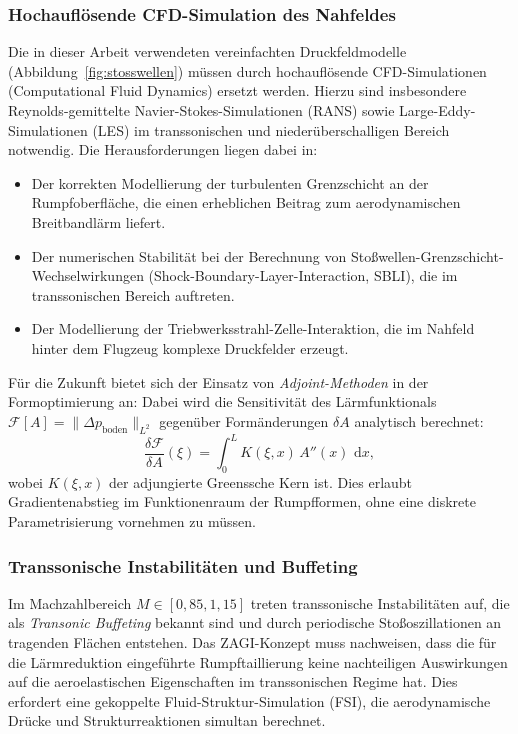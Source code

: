 ﻿\documentclass[12pt,a4paper]{article}
\theoremstyle{definition}
\theoremstyle{remark}
\newcommand{\dd}{\,\mathrm{d}}
\begin{document}
\subsubsection{Hochauflösende CFD-Simulation des Nahfeldes}

Die in dieser Arbeit verwendeten vereinfachten Druckfeldmodelle (Abbildung~\ref{fig:stosswellen})
müssen durch hochauflösende CFD-Simulationen (Computational Fluid Dynamics) ersetzt werden.
Hierzu sind insbesondere Reynolds-gemittelte Navier-Stokes-Simulationen (RANS) sowie
Large-Eddy-Simulationen (LES) im transsonischen und niederüberschalligen Bereich notwendig.
Die Herausforderungen liegen dabei in:

\begin{itemize}
  \item Der korrekten Modellierung der turbulenten Grenzschicht an der Rumpfoberfläche,
        die einen erheblichen Beitrag zum aerodynamischen Breitbandlärm liefert.
  \item Der numerischen Stabilität bei der Berechnung von Stoßwellen-Grenzschicht-
        Wechselwirkungen (Shock-Boundary-Layer-Interaction, SBLI), die im transsonischen
        Bereich auftreten.
  \item Der Modellierung der Triebwerksstrahl-Zelle-Interaktion, die im Nahfeld hinter
        dem Flugzeug komplexe Druckfelder erzeugt.
\end{itemize}

Für die Zukunft bietet sich der Einsatz von \emph{Adjoint-Methoden} in der
Formoptimierung an: Dabei wird die Sensitivität des Lärmfunktionals
$\mathcal{F}[A] = \|\Delta p_\text{boden}\|_{L^2}$ gegenüber Formänderungen $\delta A$
analytisch berechnet:
\begin{equation}
  \frac{\delta \mathcal{F}}{\delta A}(\xi) = \int_0^L K(\xi, x)\, A''(x)\, \dd x,
  \label{eq:adjoint}
\end{equation}
wobei $K(\xi, x)$ der adjungierte Greenssche Kern ist. Dies erlaubt Gradientenabstieg
im Funktionenraum der Rumpfformen, ohne eine diskrete Parametrisierung vornehmen zu müssen.

\subsubsection{Transsonische Instabilitäten und Buffeting}

Im Machzahlbereich $M \in [0{,}85, 1{,}15]$ treten transsonische Instabilitäten auf,
die als \emph{Transonic Buffeting} bekannt sind und durch periodische Stoßoszillationen
an tragenden Flächen entstehen. Das ZAGI-Konzept muss nachweisen, dass die für die
Lärmreduktion eingeführte Rumpftaillierung keine nachteiligen Auswirkungen auf die
aeroelastischen Eigenschaften im transsonischen Regime hat. Dies erfordert eine
gekoppelte Fluid-Struktur-Simulation (FSI), die aerodynamische Drücke und Strukturreaktionen
simultan berechnet.
\end{document}
